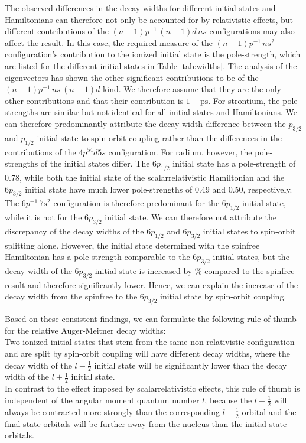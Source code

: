 The observed differences in the decay widths for different initial states and
Hamiltonians can therefore not only be accounted for by relativistic
effects, but different contributions of the $(n-1)p^{-1} \,(n-1)d \, ns$
configurations may also affect the result.
In this case, the required measure of the $(n-1)p^{-1} \, ns^2$ configuration's
contribution to the ionized initial state is the pole-strength,
which are listed for the different initial states in Table \ref{tab:widths}.
The analysis of the eigenvectors has shown the other significant contributions
to be of the $(n-1)p^{-1} \,ns \, (n-1)d$ kind. We therefore assume that
they are the only other contributions and that their contribution is $1-\text{ps}$.
For strontium, the pole-strengths are similar but not identical for all initial
states and Hamiltonians. 
We can therefore predominantly attribute the decay width difference between the
$p_{3/2}$ and $p_{1/2}$ initial state to spin-orbit coupling rather than the
differences in the contributions of the $4p^54d5s$ configuration.
For radium, however, the pole-strengths of the initial states differ.
The $6p_{1/2}$ initial state has a pole-strength of 0.78, while both the
initial state of the scalarrelativistic Hamiltonian and the $6p_{3/2}$ initial
state have much lower pole-strengths of 0.49 and 0.50, respectively.
The $6p^{-1} \,7s^2$ configuration is therefore predominant for the $6p_{1/2}$
initial state, while it is not for the $6p_{3/2}$ initial state.
We can therefore not attribute the discrepancy of the decay widths of the
$6p_{1/2}$ and $6p_{3/2}$ initial states to spin-orbit splitting alone.
However, the initial state determined with the spinfree
Hamiltonian has a pole-strength comparable to the $6p_{3/2}$ initial states,
but the decay width of the $6p_{3/2}$ initial state is increased by \unit[236]{\%}
compared to the spinfree result and therefore
significantly lower.
Hence, we can explain the increase of the decay width from the spinfree to the
$6p_{3/2}$ initial state by spin-orbit coupling.





Based on these consistent findings, we can formulate the following rule of thumb for
the relative Auger-Meitner decay widths:\\
Two ionized initial states that stem from the same non-relativistic configuration and
are split by spin-orbit coupling will have different decay widths, where the decay width
of the $l-\frac12$ initial state will be significantly lower than the decay width of
the $l + \frac12$ initial state.\\
In contrast to the effect imposed by scalarrelativistic effects, this rule
of thumb is independent of the angular moment quantum number $l$, because the
$l-\frac12$ will always be contracted more strongly than the corresponding
$l+\frac12$ orbital and the final state orbitals will be further away from
the nucleus than the initial state orbitals.

